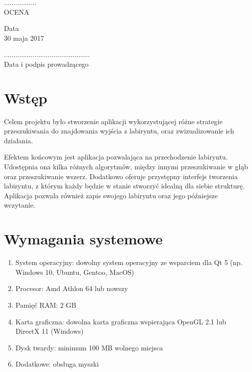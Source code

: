 \documentclass[12pt,a4paper]{article}
\newcommand{\datazajec}{30 maja 2017}
\begin{document}
	\begin{flushright}
		\begin{minipage}[t]{0.3\linewidth}
			\centering
			................. \\
			\small OCENA
		\end{minipage}
	\end{flushright}
	
	\begin{minipage}[t]{0.4\linewidth}
		\centering
		Data \\
		\small \datazajec
	\end{minipage}
	
	\begin{flushright}
		\begin{minipage}[t]{0.5\linewidth}
			\centering
			............................................. \\
			\small \textsf{Data i podpis prowadzącego}
		\end{minipage}
	\end{flushright}
	\pagebreak

	\tableofcontents

	\pagebreak

	
	\section{Wstęp}
	Celem projektu było stworzenie aplikacji wykorzystującej różne
	strategie przeszukiwania do znajdowania wyjścia z labiryntu, oraz
	zwizualizowanie ich działania.
	
	Efektem końcowym jest aplikacja pozwalająca na przechodzenie
	labiryntu. Udostępnia ona kilka różnych algorytmów, między innymi
	przeszukiwanie w głąb oraz przeszukiwanie wszerz. Dodatkowo oferuje
	przystępny interfejs tworzenia labiryntu, z którym każdy będzie w
	stanie stworzyć idealną dla siebie strukturę. Aplikacja pozwala
	również zapis swojego labiryntu oraz jego późniejsze wczytanie.
	
	\section{Wymagania systemowe}
		\begin{enumerate}[label=•]
			\item System operacyjny: dowolny system operacyjny ze 
				wsparciem dla Qt 5 (np. Windows 10, Ubuntu, Gentoo, 
				MacOS)
			\item Procesor: Amd Athlon 64 lub nowszy
			\item Pamięć RAM: 2 GB
			\item Karta graficzna: dowolna karta graficzna wspierająca
				OpenGL 2.1 lub DirectX 11 (Windows)
			\item Dysk twardy: minimum 100 MB wolnego miejsca
			\item Dodatkowe: obsługa myszki
		\end{enumerate}
		
\end{document}
